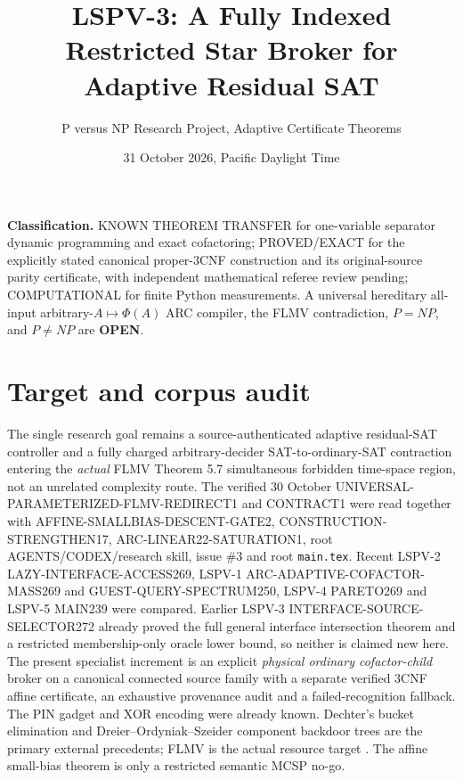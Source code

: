 \documentclass[11pt]{article}
\title{LSPV-3: A Fully Indexed Restricted Star Broker for Adaptive Residual SAT}
\author{P versus NP Research Project, Adaptive Certificate Theorems}
\date{31 October 2026, Pacific Daylight Time}
\begin{document}
\maketitle
\noindent\textbf{Classification.} KNOWN THEOREM TRANSFER for one-variable separator dynamic programming and exact cofactoring; PROVED/EXACT for the explicitly stated canonical proper-3CNF construction and its original-source parity certificate, with independent mathematical referee review pending; COMPUTATIONAL for finite Python measurements. A universal hereditary all-input arbitrary-$A\mapsto\Phi(A)$ ARC compiler, the FLMV contradiction, $P=NP$, and $P\ne NP$ are \textbf{OPEN}.

\section{Target and corpus audit}
The single research goal remains a source-authenticated adaptive residual-SAT controller and a fully charged arbitrary-decider SAT-to-ordinary-SAT contraction entering the \emph{actual} FLMV Theorem 5.7 simultaneous forbidden time-space region, not an unrelated complexity route. The verified 30 October UNIVERSAL-PARAMETERIZED-FLMV-REDIRECT1 and CONTRACT1 were read together with AFFINE-SMALLBIAS-DESCENT-GATE2, CONSTRUCTION-STRENGTHEN17, ARC-LINEAR22-SATURATION1, root AGENTS/CODEX/research skill, issue \#3 and root \texttt{main.tex}. Recent LSPV-2 LAZY-INTERFACE-ACCESS269, LSPV-1 ARC-ADAPTIVE-COFACTOR-MASS269 and GUEST-QUERY-SPECTRUM250, LSPV-4 PARETO269 and LSPV-5 MAIN239 were compared. Earlier LSPV-3 INTERFACE-SOURCE-SELECTOR272 already proved the full general interface intersection theorem and a restricted membership-only oracle lower bound, so neither is claimed new here. The present specialist increment is an explicit \emph{physical ordinary cofactor-child} broker on a canonical connected source family with a separate verified 3CNF affine certificate, an exhaustive provenance audit and a failed-recognition fallback. The PIN gadget and XOR encoding were already known. Dechter's bucket elimination and Dreier--Ordyniak--Szeider component backdoor trees are the primary external precedents; FLMV is the actual resource target \cite{dechter1999,dreier2024,flmv2005}. The affine small-bias theorem is only a restricted semantic MCSP no-go.
\end{document}
